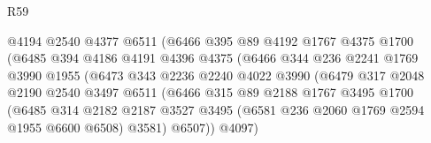 \begin{lexlean}{R59}
\begin{coremodule}
                                  @4194
                                  @2540
                                  @4377
                                  @6511
                                  (@6466
                                    @395
                                    @89
                                    @4192
                                    @1767
                                    @4375
                                    @1700
                                    (@6485
                                      @394
                                      @4186
                                      @4191
                                      @4396
                                      @4375
                                      (@6466
                                        @344
                                        @236
                                        @2241
                                        @1769
                                        @3990
                                        @1955
                                        (@6473
                                          @343
                                          @2236
                                          @2240
                                          @4022
                                          @3990
                                          (@6479
                                            @317
                                            @2048
                                            @2190
                                            @2540
                                            @3497
                                            @6511
                                            (@6466
                                              @315
                                              @89
                                              @2188
                                              @1767
                                              @3495
                                              @1700
                                              (@6485
                                                @314
                                                @2182
                                                @2187
                                                @3527
                                                @3495
                                                (@6581 @236 @2060 @1769 @2594 @1955 @6600 @6508)
                                                @3581)
                                              @6507))
                                          @4097)

\end{coremodule}
\end{lexlean}
